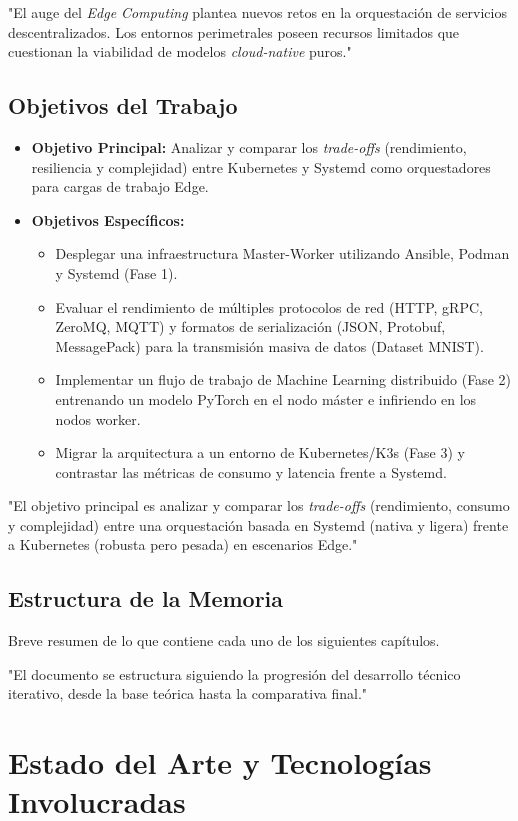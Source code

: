 \documentclass[11pt, a4paper]{report}
\begin{document}
"El auge del \textit{Edge Computing} plantea nuevos retos en la orquestación de servicios descentralizados. Los entornos perimetrales poseen recursos limitados que cuestionan la viabilidad de modelos \textit{cloud-native} puros."

\section{Objetivos del Trabajo}
\begin{itemize}
    \item \textbf{Objetivo Principal:} Analizar y comparar los \textit{trade-offs} (rendimiento, resiliencia y complejidad) entre Kubernetes y Systemd como orquestadores para cargas de trabajo Edge.
    \item \textbf{Objetivos Específicos:}
    \begin{itemize}
        \item Desplegar una infraestructura Master-Worker utilizando Ansible, Podman y Systemd (Fase 1).
        \item Evaluar el rendimiento de múltiples protocolos de red (HTTP, gRPC, ZeroMQ, MQTT) y formatos de serialización (JSON, Protobuf, MessagePack) para la transmisión masiva de datos (Dataset MNIST).
        \item Implementar un flujo de trabajo de Machine Learning distribuido (Fase 2) entrenando un modelo PyTorch en el nodo máster e infiriendo en los nodos worker.
        \item Migrar la arquitectura a un entorno de Kubernetes/K3s (Fase 3) y contrastar las métricas de consumo y latencia frente a Systemd.
    \end{itemize}
\end{itemize}

"El objetivo principal es analizar y comparar los \textit{trade-offs} (rendimiento, consumo y complejidad) entre una orquestación basada en Systemd (nativa y ligera) frente a Kubernetes (robusta pero pesada) en escenarios Edge."

\section{Estructura de la Memoria}
Breve resumen de lo que contiene cada uno de los siguientes capítulos.

"El documento se estructura siguiendo la progresión del desarrollo técnico iterativo, desde la base teórica hasta la comparativa final."

\chapter{Estado del Arte y Tecnologías Involucradas}
\end{document}
